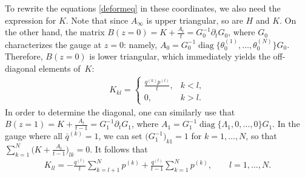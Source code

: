 \documentclass[pdftex]{sigma}
\numberwithin{equation}{section}
\begin{document}
To rewrite the equations \eqref{deformeq} in these coordinates, we also need the expression for $K$. Note that since $A_{\infty}$ is upper triangular, so are $H$ and $K$. On the other hand, the mat\-rix $B(z=0)=K+\frac{A_t}{t}=G_0^{-1}\partial_tG_0$, where $G_0$ characterizes the gauge at $z=0$: namely, $A_0=G_0^{-1}\operatorname{diag}\bigl\{\theta_0^{(1)},\ldots,\theta_0^{(N)}\bigr\}G_0$. Therefore, $B(z=0)$ is lower triangular, which immediately yields the off-diagonal elements of~$K$:
\begin{gather*}
K_{kl}=\begin{cases}
\displaystyle \frac{q^{(k)} p^{(l)}}{t}, &k<l,\\
 0, & k>l.
\end{cases}
\end{gather*}
In order to determine the diagonal, one can similarly use that $B(z=1)=K+\frac{A_t}{t-1}=G_1^{-1}\partial_t G_1$, where $A_1=G_1^{-1}\operatorname{diag} \{\Lambda_1,0,\ldots,0 \}
G_1$. In the gauge where all $\bar q^{(k)}=1$, we can set $\big(G_1^{-1}\big)_{k1}=1$ for $k=1,\ldots, N$, so that $\sum\limits_{k=1}^N\big(K+\frac{A_t}{t-1}\big)_{lk}=0$. It follows that
\begin{gather*}
K_{ll}=-\frac{q^{(l)}}{t}\sum_{k=l+1}^N p^{(k)}+\frac{q^{(l)}}{t-1} \sum_{k=1}^N p^{(k)},\qquad l=1,\ldots,N.
\end{gather*}
\end{document}
